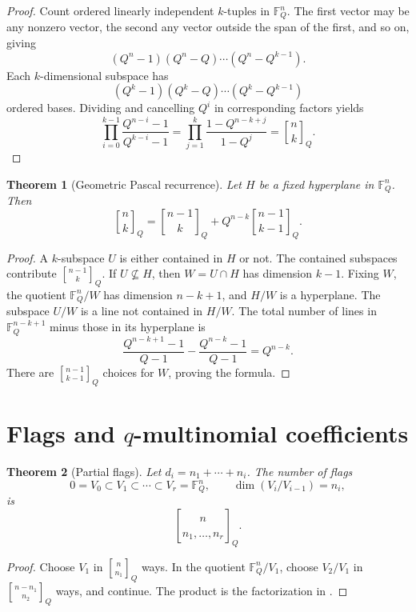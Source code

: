 \documentclass[11pt,oneside,openany]{book}
\newtheorem{theorem}{Theorem}[chapter]
\theoremstyle{definition}
\theoremstyle{remark}
\newcommand{\Qbinom}[3]{\genfrac{[}{]}{0pt}{}{#1}{#2}_{#3}}
\newcommand{\F}{\mathbb F}
\begin{document}
\begin{proof}
Count ordered linearly independent $k$-tuples in $\F_Q^n$.  The first vector may be any nonzero vector, the second any vector outside the span of the first, and so on, giving
\[
 (Q^n-1)(Q^n-Q)\cdots(Q^n-Q^{k-1}).
\]
Each $k$-dimensional subspace has
\[
 (Q^k-1)(Q^k-Q)\cdots(Q^k-Q^{k-1})
\]
ordered bases.  Dividing and cancelling $Q^i$ in corresponding factors yields
\[
 \prod_{i=0}^{k-1}\frac{Q^{n-i}-1}{Q^{k-i}-1}
 =\prod_{j=1}^{k}\frac{1-Q^{n-k+j}}{1-Q^j}
 =\Qbinom nkQ.
\]
\end{proof}

\begin{theorem}[Geometric Pascal recurrence]\label{thm:geometric-pascal}
Let $H$ be a fixed hyperplane in $\F_Q^n$.  Then
\[
 \Qbinom nkQ
 =\Qbinom{n-1}{k}Q+Q^{n-k}\Qbinom{n-1}{k-1}Q.
\]
\end{theorem}

\begin{proof}
A $k$-subspace $U$ is either contained in $H$ or not.  The contained subspaces contribute $\Qbinom{n-1}{k}Q$.  If $U\not\subseteq H$, then $W=U\cap H$ has dimension $k-1$.  Fixing $W$, the quotient $\F_Q^n/W$ has dimension $n-k+1$, and $H/W$ is a hyperplane.  The subspace $U/W$ is a line not contained in $H/W$.  The total number of lines in $\F_Q^{n-k+1}$ minus those in its hyperplane is
\[
 \frac{Q^{n-k+1}-1}{Q-1}-\frac{Q^{n-k}-1}{Q-1}=Q^{n-k}.
\]
There are $\Qbinom{n-1}{k-1}Q$ choices for $W$, proving the formula.
\end{proof}

\section{Flags and \texorpdfstring{$q$}{q}-multinomial coefficients}

\begin{theorem}[Partial flags]\label{thm:flag-count}
Let $d_i=n_1+\cdots+n_i$.  The number of flags
\[
 0=V_0\subset V_1\subset\cdots\subset V_r=\F_Q^n,
 \qquad \dim(V_i/V_{i-1})=n_i,
\]
is
\[
 \genfrac{[}{]}{0pt}{}{n}{n_1,\dots,n_r}_{Q}.
\]
\end{theorem}

\begin{proof}
Choose $V_1$ in $\Qbinom n{n_1}Q$ ways.  In the quotient $\F_Q^n/V_1$, choose $V_2/V_1$ in $\Qbinom{n-n_1}{n_2}Q$ ways, and continue.  The product is the factorization in .
\end{proof}
\end{document}

